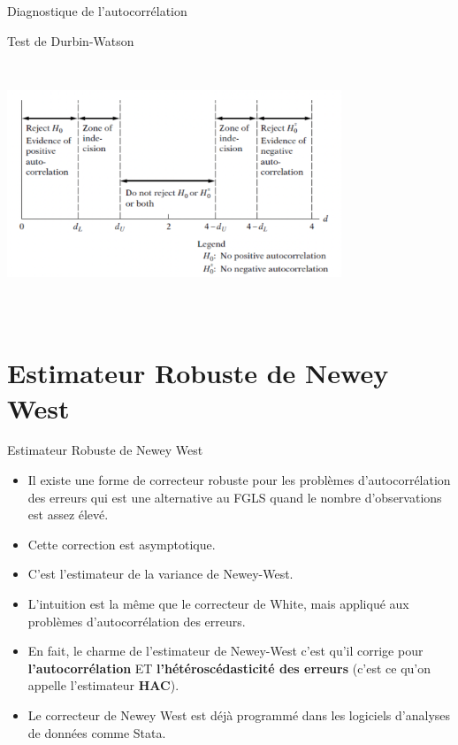 \documentclass{beamer}
\begin{document}
\begin{frame}{Diagnostique de l'autocorrélation}
\begin{block}{Test de Durbin-Watson}
\includegraphics[width=10cm, height=8cm]{DW.png}
\end{block}
\end{frame}

\section{Estimateur Robuste de Newey West}

\frame{\tableofcontents[current]}


\begin{frame}{Estimateur Robuste de Newey West}
\begin{itemize}
\item Il existe une forme de correcteur robuste pour les problèmes d’autocorrélation des erreurs qui est une alternative au FGLS quand le nombre d’observations est assez élevé.
\item Cette correction est asymptotique.
\item C’est l’estimateur de la variance de Newey-West. 
\item L’intuition est la même que le correcteur de White, mais appliqué aux problèmes d’autocorrélation des erreurs.
\item En fait, le charme de l’estimateur de Newey-West c’est qu’il corrige pour \textbf{l’autocorrélation} ET \textbf{l’hétéroscédasticité des erreurs} (c’est ce qu’on appelle l’estimateur \textbf{HAC}).
\item Le correcteur de Newey West est déjà programmé dans les logiciels d’analyses de données comme Stata.
\end{itemize}
\end{frame}
\end{document}
